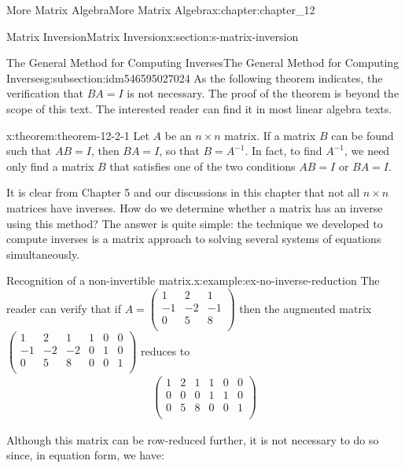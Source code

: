 \documentclass[oneside,10pt,]{book}
\numberwithin{equation}{section}
\begin{document}
\begin{chapterptx}{More Matrix Algebra}{}{More Matrix Algebra}{}{}{x:chapter:chapter_12}
\begin{sectionptx}{Matrix Inversion}{}{Matrix Inversion}{}{}{x:section:s-matrix-inversion}
%
\begin{subsectionptx}{The General Method for Computing Inverses}{}{The General Method for Computing Inverses}{}{}{g:subsection:idm546595027024}
As the following theorem indicates, the verification that \(B A = I\) is not necessary.  The proof of the theorem is beyond the scope of this text.  The interested reader can find it in most linear algebra texts.%
\begin{theorem}{}{}{x:theorem:theorem-12-2-1}%
Let \(A\) be an \(n \times  n\) matrix. If a matrix \(B\) can be found such that \(A B = I\), then \(B A = I\), so that  \(B = A^{-1}\). In fact, to find \(A^{-1}\), we need only find a matrix \(B\) that satisfies one of the two conditions \(A B = I\) or \(B A = I\).%
\end{theorem}
It is clear from Chapter 5 and our discussions in this chapter that not all \(n \times  n\) matrices have inverses. How do we determine whether a matrix has an inverse using this method? The answer is quite simple: the technique we developed to compute inverses is a matrix approach to solving several systems of equations simultaneously.%
\begin{example}{Recognition of a non-invertible matrix.}{x:example:ex-no-inverse-reduction}%
The reader can verify that if \(A=\left(
\begin{array}{ccc}
1 & 2 & 1 \\
-1 & -2 & -1 \\
0 & 5 & 8 \\
\end{array}
\right)\) then the augmented matrix \(\left(
\begin{array}{ccc|ccc}
1 & 2 & 1 & 1 & 0 & 0 \\
-1 & -2 & -2 & 0 & 1 & 0 \\
0 & 5 & 8 & 0 & 0 & 1 \\
\end{array}
\right)\) reduces to%
\begin{align}
\left(
\begin{array}{ccc|ccc}
1 & 2 & 1 & 1 & 0 & 0 \\
0 & 0 & 0 & 1 & 1 & 0 \\
0 & 5 & 8 & 0 & 0 & 1 \\
\end{array}
\right)\label{x:mrow:reduced-with-zero}
\end{align}
%
\par
Although this matrix can be row-reduced further, it is not necessary to do so since, in equation form, we have:%

\end{example}
\end{subsectionptx}
\end{sectionptx}
\end{chapterptx}
\end{document}
